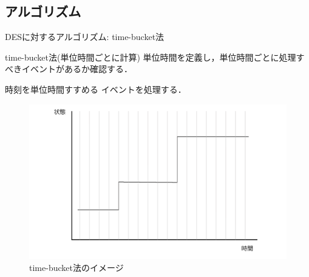 \documentclass[dvipdfmx,uplatex,11pt]{beamer}
\theoremstyle{definition}
\begin{document}
\subsection{アルゴリズム}
\begin{frame}{DESに対するアルゴリズム: time-bucket法}
  \begin{block}{time-bucket法(単位時間ごとに計算)}
    単位時間を定義し，単位時間ごとに処理すべきイベントがあるか確認する．
    \begin{algorithmic}[1]
      \STATE 時刻を単位時間すすめる
        \STATE イベントを処理する．
      \ENDIF
      \ENDWHILE
    \end{algorithmic}
  \end{block}

  \begin{figure}[htb]
    \includegraphics[scale=0.25]{continuous_sim_time_bucket.png}
    \caption{time-bucket法のイメージ}
  \end{figure}

\end{frame}

\end{document}
